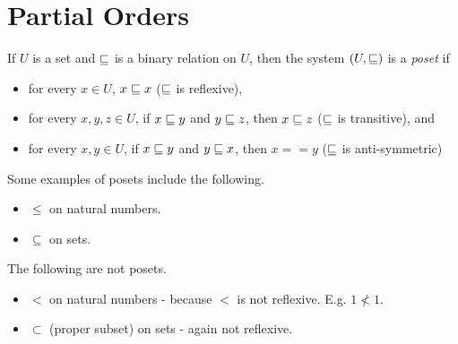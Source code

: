\section{Partial Orders}
\begin{definition}
  If $U$ is a set and $\sqsubseteq$ is a binary relation on $U$, then the system
  $(U, \sqsubseteq)$ is a \emph{poset} if
  \begin{itemize}
  \item for every $x \in U$, $x \sqsubseteq x$ ($\sqsubseteq$ is reflexive),
  \item for every $x,y,z \in U$, if $x \sqsubseteq y$ and $y \sqsubseteq z$, then $x \sqsubseteq z$ ($\sqsubseteq$ is transitive), and
  \item for every $x,y \in U$, if $x \sqsubseteq y$ and $y \sqsubseteq x$, then $x == y$ ($\sqsubseteq$ is anti-symmetric)
  \end{itemize}
\end{definition}

\begin{example}[Posets]
  Some examples of posets include the following.
  \begin{itemize}
  \item $\leq$ on natural numbers.
  \item $\subseteq$ on sets.
  \end{itemize}
\end{example}

\begin{example}
  The following are not posets.
  \begin{itemize}
  \item $<$ on natural numbers - because $<$ is not reflexive. E.g. $1\nless{}1$.
  \item $\subset$ (proper subset) on sets - again not reflexive.
  \end{itemize}
\end{example}

